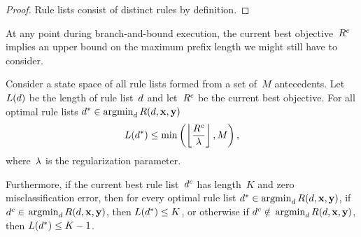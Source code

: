 \begin{arxiv}
\begin{proof}
Rule lists consist of distinct rules by definition.
\end{proof}
\end{arxiv}

At any point during branch-and-bound execution, the current best objective~${R^c}$
implies an upper bound on the maximum prefix length we might still have to consider.
%
\begin{theorem}
\label{thm:ub-prefix-length}
Consider a state space of all rule lists formed from a set of~$M$ antecedents.
%
Let~$L({d})$ be the length of rule list~${d}$
and let~${R^c}$ be the current best objective.
%
For all optimal rule lists ${d^* \in \operatorname*{argmin}_{d} R({d}, \mathbf{x}, \mathbf{y})}$
\begin{align}
L(\OptimalRL) \le \min \left(\left\lfloor \frac{\CurrentObj}{\Reg} \right\rfloor, M \right),
\label{eq:max-length}
\end{align}
where~${\lambda}$ is the regularization parameter.
%
\begin{arxiv}
Furthermore, if the current best rule list~$d^c$
has length~$K$ and zero misclassification error,
then for every optimal rule list
${d^* \in \operatorname*{argmin}_{d} R({d}, \mathbf{x}, \mathbf{y})}$,
if ${d^c \in}$ ${\operatorname*{argmin}_d R({d}, \mathbf{x}, \mathbf{y})}$,
then ${L(d^*) \le K}$,
or otherwise if ${d^c \notin}$ ${\operatorname*{argmin}_d R({d}, \mathbf{x}, \mathbf{y})}$,
then ${L(d^*) \le K - 1}$.
\end{arxiv}
\end{theorem}

